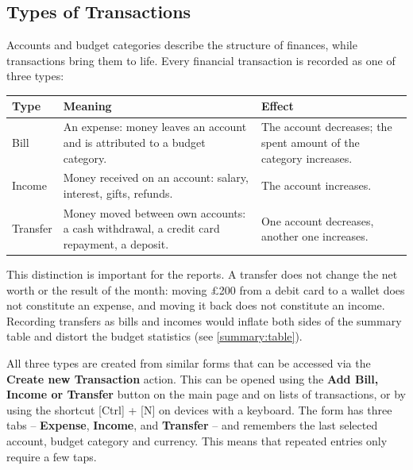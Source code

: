 
\subsection{Types of Transactions}

Accounts and budget categories describe the structure of finances, while transactions bring
them to life. Every financial transaction is recorded as one of three types:

\begin{center}
\small
\begin{tabularx}{\textwidth}{|l|X|X|}
  \hline
  \textbf{Type} & \textbf{Meaning} & \textbf{Effect} \\
  \hline
  Bill & An expense: money leaves an account and is attributed to a budget category. & The
  account decreases; the spent amount of the category increases. \\
  \hline
  Income & Money received on an account: salary, interest, gifts, refunds. & The account
  increases. \\
  \hline
  Transfer & Money moved between own accounts: a cash withdrawal, a credit card repayment, a
  deposit. & One account decreases, another one increases. \\
  \hline
\end{tabularx}
\end{center}

\noindent This distinction is important for the reports. A transfer does not change the net
worth or the result of the month: moving £200 from a debit card to a wallet does not
constitute an expense, and moving it back does not constitute an income. Recording transfers
as bills and incomes would inflate both sides of the summary table and distort the budget
statistics (see \cref{summary:table}).

All three types are created from similar forms that can be accessed via the
\textbf{Create new Transaction} action. This can be opened using the
\textbf{Add Bill, Income or Transfer} button on the main page and on lists of transactions,
or by using the shortcut [Ctrl] + [N]  on devices with a keyboard.
The form has three tabs -- \textbf{Expense}, \textbf{Income}, and \textbf{Transfer}  -- and
remembers the last selected account, budget category and currency. This means that repeated
entries only require a few taps.


